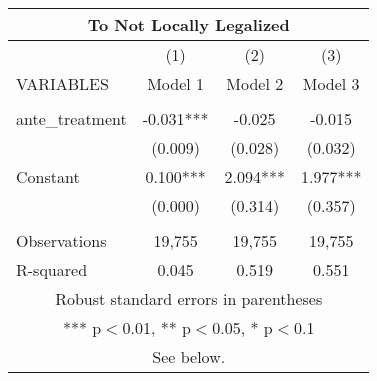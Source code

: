 \begin{tabular}{lccc}
\multicolumn{4}{c}{To Not Locally Legalized} \\ \hline
 & (1) & (2) & (3) \\
VARIABLES & Model 1 & Model 2 & Model 3 \\ \hline
 &  &  &  \\
ante\_treatment & -0.031*** & -0.025 & -0.015 \\
 & (0.009) & (0.028) & (0.032) \\
Constant & 0.100*** & 2.094*** & 1.977*** \\
 & (0.000) & (0.314) & (0.357) \\
 &  &  &  \\
Observations & 19,755 & 19,755 & 19,755 \\
 R-squared & 0.045 & 0.519 & 0.551 \\ \hline
\multicolumn{4}{c}{ Robust standard errors in parentheses} \\
\multicolumn{4}{c}{ *** p$<$0.01, ** p$<$0.05, * p$<$0.1} \\
\multicolumn{4}{c}{ See below.} \\
\end{tabular}
